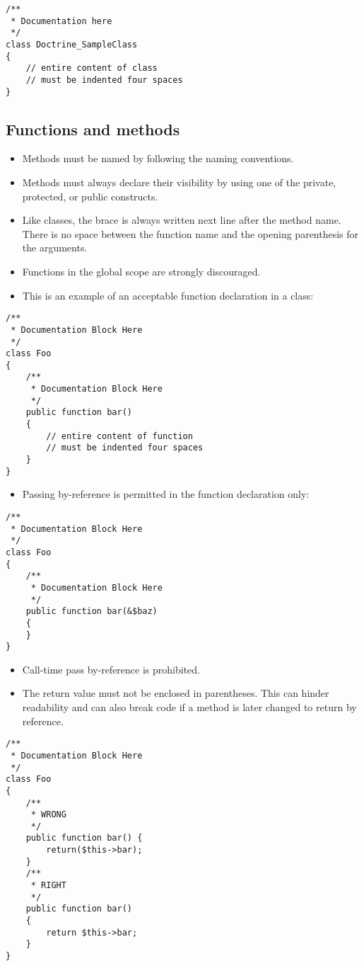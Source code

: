 \documentclass[11pt,a4paper]{report}
\begin{document}
\begin{verbatim}
/**
 * Documentation here
 */
class Doctrine_SampleClass
{
    // entire content of class
    // must be indented four spaces
}
\end{verbatim}

\subsection{Functions and methods}
\begin{itemize}
\item{Methods must be named by following the naming conventions.}
\item{Methods must always declare their visibility by using one of the private, protected, or public constructs.}
\item{Like classes, the brace is always written next line after the method name. There is no space between the function name and the opening parenthesis for the arguments.}
\item{Functions in the global scope are strongly discouraged.}
\item{This is an example of an acceptable function declaration in a class:}
\end{itemize}
\begin{verbatim}
/**
 * Documentation Block Here
 */
class Foo
{
    /**
     * Documentation Block Here
     */
    public function bar()
    {
        // entire content of function
        // must be indented four spaces
    }
}
\end{verbatim}

\begin{itemize}
\item{Passing by-reference is permitted in the function declaration only:}
\end{itemize}
\begin{verbatim}
/**
 * Documentation Block Here
 */
class Foo
{
    /**
     * Documentation Block Here
     */
    public function bar(&$baz)
    {
    }
}
\end{verbatim}

\begin{itemize}
\item{Call-time pass by-reference is prohibited.}
\item{The return value must not be enclosed in parentheses. This can hinder readability and can also break code if a method is later changed to return by reference.}
\end{itemize}
\begin{verbatim}
/**
 * Documentation Block Here
 */
class Foo
{
    /**
     * WRONG
     */
    public function bar() {
        return($this->bar);
    }
    /**
     * RIGHT
     */
    public function bar()
    {
        return $this->bar;
    }
}
\end{verbatim}
\end{document}
